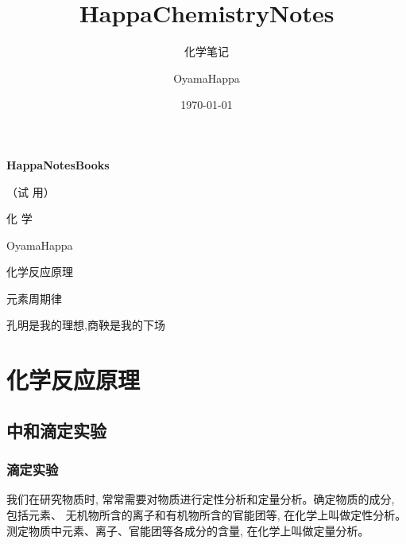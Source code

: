 \documentclass[10pt,cn]{elegantbook}
\title{HappaChemistryNotes}
\subtitle{化学笔记}
\author{OyamaHappa}
\date{\today}
\begin{document}
	
	\begin{titlepage}
		\begin{center}
			\vspace*{3cm}
			
			{\Large \textbf{HappaNotesBooks} }
			
			{\Large（试 用）}
			
			\vspace{1cm}
			
			{\Huge 化 \qquad 学}
			
			\vspace{0.5cm}
			
			
			
			
			
			
			\vspace{1cm}
			
		OyamaHappa
			
			\vfill
			化学反应原理
			
			元素周期律
			
			孔明是我的理想,商鞅是我的下场
			
			
			
		\end{center}
	\end{titlepage}
	
	
	\tableofcontents
	
	\mainmatter

	\part{化学反应原理}
    \chapter{中和滴定实验}
	\section{滴定实验}
	
	我们在研究物质时, 常常需要对物质进行定性分析和定量分析。确定物质的成分, 包括元素、 无机物所含的离子和有机物所含的官能团等, 在化学上叫做定性分析。测定物质中元素、离子、官能团等各成分的含量, 在化学上叫做定量分析。
	
	
\end{document}
